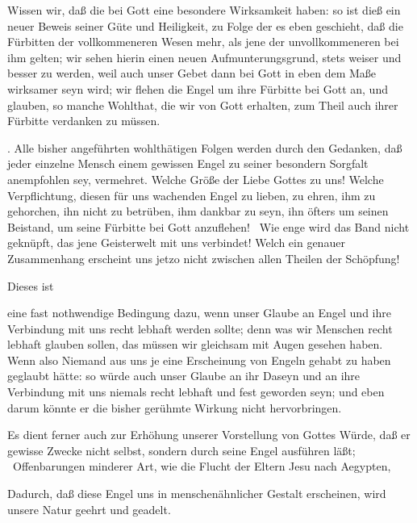 \begin{aufza}
\begin{aufzb}
\item Wissen wir, daß die  bei Gott eine besondere Wirksamkeit haben: so ist dieß ein neuer Beweis seiner Güte und Heiligkeit, zu Folge der es eben geschieht, daß die Fürbitten der vollkommeneren Wesen mehr, als jene der unvollkommeneren bei ihm gelten; wir sehen hierin einen neuen Aufmunterungsgrund, stets weiser und besser zu werden, weil auch unser Gebet dann bei Gott in eben dem Maße wirksamer seyn wird; wir flehen die Engel um ihre Fürbitte bei Gott an, und glauben, so manche Wohlthat, die wir von Gott erhalten, zum Theil auch ihrer Fürbitte verdanken zu müssen.
\item {}. Alle bisher angeführten wohlthätigen Folgen werden durch den Gedanken, daß jeder einzelne Mensch einem gewissen Engel zu seiner besondern Sorgfalt anempfohlen sey, vermehret. Welche Größe der Liebe Gottes zu uns! Welche Verpflichtung, diesen für uns wachenden Engel zu lieben, zu ehren, ihm zu gehorchen, ihn nicht zu betrüben, ihm dankbar zu seyn, ihn öfters um seinen Beistand, um seine Fürbitte bei Gott anzuflehen! \usw\ Wie enge wird das Band nicht geknüpft, das jene Geisterwelt mit uns verbindet! Welch ein genauer Zusammenhang erscheint uns jetzo nicht zwischen allen Theilen der Schöpfung!
\item {} Dieses ist
\begin{aufzc}
\item eine fast nothwendige Bedingung dazu, wenn unser Glaube an Engel und ihre Verbindung mit uns recht lebhaft werden sollte; denn was wir Menschen recht lebhaft glauben sollen, das müssen wir gleichsam mit Augen gesehen haben. Wenn also Niemand aus uns je eine Erscheinung von Engeln gehabt zu haben geglaubt hätte: so würde auch unser Glaube an ihr Daseyn und an ihre Verbindung mit uns niemals recht lebhaft und fest geworden seyn; und eben darum könnte er die bisher gerühmte Wirkung nicht hervorbringen.
\item Es dient ferner auch zur Erhöhung unserer Vorstellung von Gottes Würde, daß er gewisse Zwecke nicht selbst, sondern durch seine Engel ausführen läßt; \zB\ Offenbarungen minderer Art, wie die Flucht der Eltern Jesu nach Aegypten, \udgl\ 
\item Dadurch, daß diese Engel uns in menschenähnlicher Gestalt erscheinen, wird unsere Natur geehrt und geadelt.~
\end{aufzc}
\end{aufzb}

\end{aufza}
